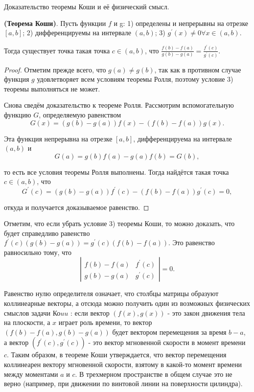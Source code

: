 \newpage

\begin{problem}
Доказательство теоремы Коши и её физический смысл.
\end{problem}
\begin{theorem}\textbf{(Теорема Коши)}.
    Пусть функции $f$ и g:
    1) определены и непрерывны на отрезке $[a, b]$;
    2) дифференцируемы на интервале $(a, b)$;
    3) $g^{\prime}(x) \neq 0 \forall x \in(a, b)$.

    Тогда существует точка такая точка $c \in(a, b)$, что $\frac{f(b)-f(a)}{g(b)-g(a)}=\frac{f^{\prime}(c)}{g^{\prime}(c)}$.
\end{theorem}
\begin{proof}
    Отметим прежде всего, что $g(a) \neq g(b)$, так как в противном случае функция $g$ удовлетворяет всем условиям теоремы Ролля, поэтому условие 3) теоремы выполняться не может.

    Снова сведём доказательство к теореме Ролля. Рассмотрим вспомогательную функцию $G$, определяемую равенством
    $$
        G(x)=(g(b)-g(a)) f(x)-(f(b)-f(a)) g(x) .
    $$

    Эта функция непрерывна на отрезке $[a, b]$, дифференцируема на интервале $(a, b)$ и
    $$
        G(a)=g(b) f(a)-g(a) f(b)=G(b),
    $$

    то есть все условия теоремы Ролля выполнены. Тогда найдётся такая точка $c \in(a, b)$, что
    $$
        G^{\prime}(c)=(g(b)-g(a)) f^{\prime}(c)-(f(b)-f(a)) g^{\prime}(c)=0,
    $$

    откуда и получается доказываемое равенство.
\end{proof}


Отметим, что если убрать условие 3) теоремы Коши, то можно доказать, что будет справедливо равенство $f^{\prime}(c)(g(b)-g(a))=g^{\prime}(c)(f(b)-f(a))$. Это равенство равносильно тому, что
$$
    \left|\begin{array}{ll}
        f(b)-f(a) & f^{\prime}(c) \\
        g(b)-g(a) & g^{\prime}(c)
    \end{array}\right|=0 .
$$

Равенство нулю определителя означает, что столбцы матрицы образуют коллинеарные векторы, а отсюда можно получить один из возможных физических смыслов задачи Ко$u u$ : если вектор $(f(x), g(x))$ - это закон движения тела на плоскости, а $x$ играет роль времени, то вектор $(f(b)-f(a), g(b)-g(a))$ будет вектором перемещения за время $b-a$, а вектор $\left(f^{\prime}(c), g^{\prime}(c)\right)$ - это вектор мгновенной скорости в момент времени $c$. Таким образом, в теореме Коши утверждается, что вектор перемещения коллинеарен вектору мгновенной скорости, взятому в какой-то момент времени между моментами $a$ и $c$. В трехмерном пространстве в общем случае это не верно (например, при движении по винтовой линии на поверхности цилиндра).
\newpage
